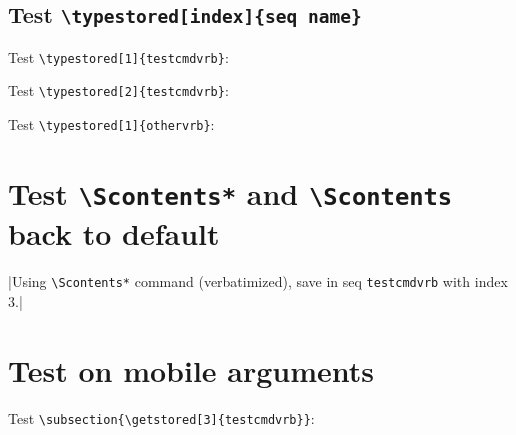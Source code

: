 \documentclass{article}
\begin{document}

\noindent\hrulefill

\subsection{Test \texttt{\textbackslash typestored[index]\{seq name\}}}

\noindent\hrulefill

Test \verb+\typestored[1]{testcmdvrb}+:\par


\noindent\hrulefill

Test \verb+\typestored[2]{testcmdvrb}+:\par


\noindent\hrulefill

Test \verb+\typestored[1]{othervrb}+:\par


\noindent\hrulefill

\section{Test \texttt{\textbackslash Scontents*} and \texttt{\textbackslash Scontents} back to default}


\Scontents*|Using \texttt{\textbackslash Scontents*} command (verbatimized), save in seq \texttt{testcmdvrb} with index $3$.|

\section{Test on mobile arguments}

\noindent\hrulefill

Test \verb+\subsection{\getstored[3]{testcmdvrb}}+:\par

\subsection{}
\end{document}
